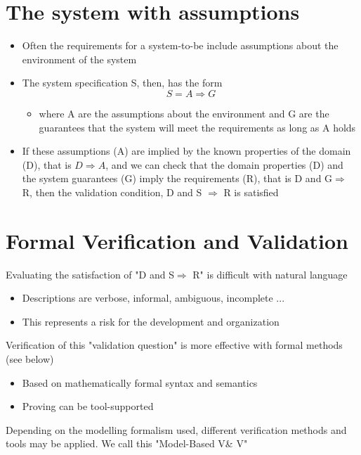 \documentclass{article}[18pt]
\begin{document}
\section{The system with assumptions}
\begin{itemize}
	\item Often the requirements for a system-to-be include assumptions about the environment of the system
	\item The system specification S, then, has the form
	$$S=A\Rightarrow G$$
	\begin{itemize}
	\item where A are the assumptions about the environment and G are the guarantees that the system will meet the requirements as long as A holds
	\end{itemize}
	\item If these assumptions (A) are implied by the known properties of the domain (D), that is $D\Rightarrow A$, and we can check that the domain properties (D) and the system guarantees (G) imply the requirements (R), that is D and G$\Rightarrow$ R, then the validation condition, D and S $\Rightarrow$ R is satisfied
\end{itemize}
\section{Formal Verification and Validation}
Evaluating the satisfaction of "D and S$\Rightarrow$ R" is difficult with natural language
\begin{itemize}
	\item Descriptions are verbose, informal, ambiguous, incomplete ...
	\item This represents a risk for the development and organization
\end{itemize}
Verification of this "validation question" is more effective with formal methods (see below)
\begin{itemize}
	\item Based on mathematically formal syntax and semantics
	\item Proving can be tool-supported
\end{itemize}
Depending on the modelling formalism used, different verification methods and tools may be applied. We call this "Model-Based V\& V"
\end{document}
